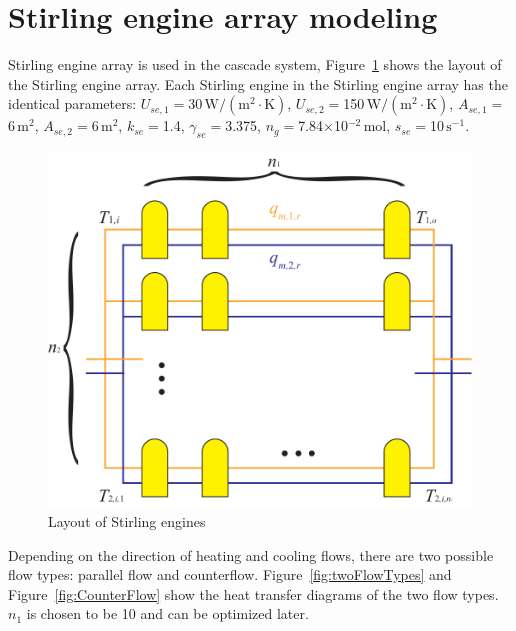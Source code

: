 
\section{Stirling engine array modeling}

Stirling engine array is used in the cascade system, Figure~\ref{fig:Layout of Stirling engines} shows the layout of the Stirling engine array. Each Stirling engine in the Stirling engine array has the identical parameters: $U_{se,1}=$30$\,\mathrm{W/(m^2\cdot{}K)}$, $U_{se,2}=$150$\,\mathrm{W/(m^2\cdot{}K)}$, $A_{se,1}=$6$\,\mathrm{m^2}$, $A_{se,2}=$6$\,\mathrm{m^2}$, $k_{se}=$1.4, $\gamma_{se}=$3.375, $n_g=$7.84$\times$10$^{-2}\,\mathrm{mol}$, $s_{se}=$10$\,\mathrm{s^{-1}}$.

\noindent \begin{figure}[htbp]
\begin{center}
	\includegraphics[width = 0.6\columnwidth]{fig/stirlingEngineArray.pdf}
	\caption{Layout of Stirling engines}
	\label{fig:Layout of Stirling engines}
\end{center}
\end{figure}

Depending on the direction of heating and cooling flows, there are two possible flow types: parallel flow and counterflow. 
Figure~\ref{fig:twoFlowTypes} and 
Figure~\ref{fig:CounterFlow} show the heat transfer diagrams of the two flow types.
 $n_1$ is chosen to be 10 and can be optimized later.

